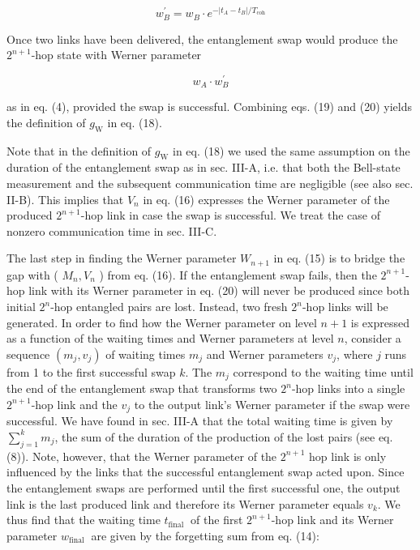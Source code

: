 \documentclass[10pt]{article}
\begin{document}
\begin{equation*}
w_{B}^{\prime}=w_{B} \cdot e^{-\left|t_{A}-t_{B}\right| / T_{\mathrm{coh}}} \tag{19}
\end{equation*}


Once two links have been delivered, the entanglement swap would produce the $2^{n+1}$-hop state with Werner parameter


\begin{equation*}
w_{A} \cdot w_{B}^{\prime} \tag{20}
\end{equation*}


as in eq. (4), provided the swap is successful. Combining eqs. (19) and (20) yields the definition of $g_{\mathrm{W}}$ in eq. (18).

Note that in the definition of $g_{\mathrm{W}}$ in eq. (18) we used the same assumption on the duration of the entanglement swap as in sec. III-A, i.e. that both the Bell-state measurement and the subsequent communication time are negligible (see also sec. II-B). This implies that $V_{n}$ in eq. (16) expresses the Werner parameter of the produced $2^{n+1}$-hop link in case the swap is successful. We treat the case of nonzero communication time in sec. III-C.

The last step in finding the Werner parameter $W_{n+1}$ in eq. (15) is to bridge the gap with ( $M_{n}, V_{n}$ ) from eq. (16). If the entanglement swap fails, then the $2^{n+1}$-hop link with its Werner parameter in eq. (20) will never be produced since both initial $2^{n}$-hop entangled pairs are lost. Instead, two fresh $2^{n}$-hop links will be generated. In order to find how the Werner parameter on level $n+1$ is expressed as a function of the waiting times and Werner parameters at level $n$, consider a sequence $\left(m_{j}, v_{j}\right)$ of waiting times $m_{j}$ and Werner parameters $v_{j}$, where $j$ runs from 1 to the first successful swap $k$. The $m_{j}$ correspond to the waiting time until the end of the entanglement swap that transforms two $2^{n}$-hop links into a single $2^{n+1}$-hop link and the $v_{j}$ to the output link's Werner parameter if the swap were successful. We have found in sec. III-A that the total waiting time is given by $\sum_{j=1}^{k} m_{j}$, the sum of the duration of the production of the lost pairs (see eq. (8)). Note, however, that the Werner parameter of the $2^{n+1}$ hop link is only influenced by the links that the successful entanglement swap acted upon. Since the entanglement swaps are performed until the first successful one, the output link is the last produced link and therefore its Werner parameter equals $v_{k}$. We thus find that the waiting time $t_{\text {final }}$ of the first $2^{n+1}$-hop link and its Werner parameter $w_{\text {final }}$ are given by the forgetting sum from eq. (14):
\end{document}
